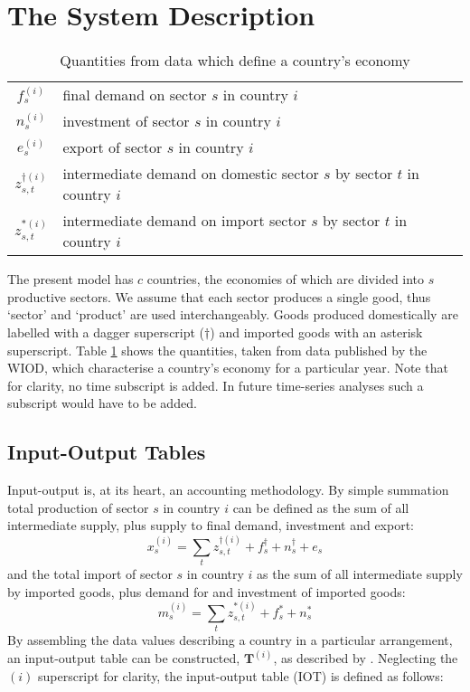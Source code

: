 \documentclass[a4paper]{article}
\begin{document}
\section{The System Description} \label{sec:system}
\begin{table}
\begin{center}
\begin{tabular}{cl}
$f_s^{(i)}$ & final demand on sector $s$ in country $i$\\
$n_s^{(i)}$ & investment of sector $s$ in country $i$\\
$e_s^{(i)}$ & export of sector $s$ in country $i$\\
$z_{s,t}^{\dagger(i)}$ & intermediate demand on domestic sector $s$ by sector $t$ in country $i$\\
$z_{s,t}^{*(i)}$ & intermediate demand on import sector $s$ by sector $t$ in country $i$
\end{tabular}
\end{center}
\caption{Quantities from data which define a country's economy}\label{tbl:cvars}
\end{table}

The present model has $c$ countries, the economies of which are divided into $s$ productive sectors.
We assume that each sector produces a single good, thus `sector' and `product' are used interchangeably. 
Goods produced domestically are labelled with a dagger superscript ($\dagger$) and imported goods with an asterisk superscript.
Table \ref{tbl:cvars} shows the quantities, taken from data published by the WIOD, which characterise a country's economy for a particular year.
Note that for clarity, no time subscript is added. In future time-series analyses such a subscript would have to be added.

\subsection{Input-Output Tables} \label{sec:iots}
Input-output is, at its heart, an accounting methodology. By simple summation total production of sector $s$ in country $i$ can be defined as the sum of all intermediate supply, plus supply to final demand, investment and export:
\begin{equation}\label{eqn:x}
x_s^{(i)}=\sum\limits_{t}z_{s,t}^{\dagger(i)} + f_s^{\dagger} + n_s^{\dagger} + e_s
\end{equation}
and the total import of sector $s$ in country $i$ as the sum of all intermediate supply by imported goods, plus demand for and investment of imported goods:
\begin{equation}\label{eqn:m}
m_s^{(i)}=\sum\limits_{t}z_{s,t}^{*(i)} + f_s^* + n_s^*
\end{equation}
By assembling the data values describing a country in a particular arrangement, an input-output table can be constructed, $\boldsymbol{T}^{(i)}$, as described by \textcite{Miller1985}.
Neglecting the $(i)$ superscript for clarity, the input-output table (IOT) is defined as follows:
\end{document}
